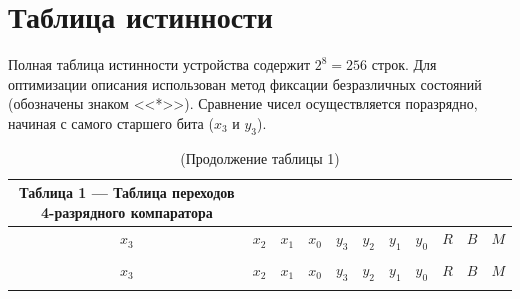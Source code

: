 \documentclass[oneside,a4paper,14pt]{extarticle}
\begin{document}
\section{Таблица истинности}
Полная таблица истинности устройства содержит $2^8 = 256$ строк. Для оптимизации описания использован метод фиксации безразличных состояний (обозначены знаком <<*>>). Сравнение чисел осуществляется поразрядно, начиная с самого старшего бита ($x_3$ и $y_3$).

\begin{center}
  \begin{longtable}{cccc|cccc|ccc}
    \caption*{Таблица 1 --- Таблица переходов 4-разрядного компаратора} \\
    \hline
    $x_3$ & $x_2$ & $x_1$ & $x_0$ & $y_3$ & $y_2$ & $y_1$ & $y_0$ & $R$ & $B$ & $M$ \\
    \hline
    \endfirsthead

    \caption*{(Продолжение таблицы 1)} \\
    \hline
    $x_3$ & $x_2$ & $x_1$ & $x_0$ & $y_3$ & $y_2$ & $y_1$ & $y_0$ & $R$ & $B$ & $M$ \\
    \hline
    \endhead

    \hline
    \endfoot

    \hline
    \endlastfoot


\end{longtable}
\end{center}
\end{document}
